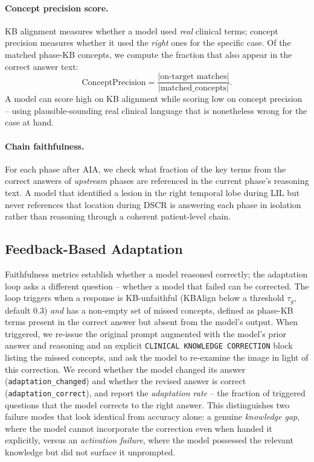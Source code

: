 \documentclass[11pt]{article}
\begin{document}
\paragraph{Concept precision score.} KB alignment measures whether a model used \emph{real} clinical terms; concept precision measures whether it used the \emph{right} ones for the specific case. Of the matched phase-KB concepts, we compute the fraction that also appear in the correct answer text:
\begin{equation}
  \label{eq:concept-precision}
  \text{ConceptPrecision} = \frac{|\text{on-target matches}|}{|\text{matched\_concepts}|}.
\end{equation}
A model can score high on KB alignment while scoring low on concept precision -- using plausible-sounding real clinical language that is nonetheless wrong for the case at hand.

\paragraph{Chain faithfulness.} For each phase after AIA, we check what fraction of the key terms from the correct answers of \emph{upstream} phases are referenced in the current phase's reasoning text. A model that identified a lesion in the right temporal lobe during LIL but never references that location during DSCR is answering each phase in isolation rather than reasoning through a coherent patient-level chain.

\subsection{Feedback-Based Adaptation}
\label{sec:adaptation}

Faithfulness metrics establish whether a model reasoned correctly; the adaptation loop asks a different question -- whether a model that failed can be corrected. The loop triggers when a response is KB-unfaithful (KBAlign below a threshold $\tau_g$, default $0.3$) \emph{and} has a non-empty set of missed concepts, defined as phase-KB terms present in the correct answer but absent from the model's output. When triggered, we re-issue the original prompt augmented with the model's prior answer and reasoning and an explicit \texttt{CLINICAL KNOWLEDGE CORRECTION} block listing the missed concepts, and ask the model to re-examine the image in light of this correction. We record whether the model changed its answer (\texttt{adaptation\_changed}) and whether the revised answer is correct (\texttt{adaptation\_correct}), and report the \emph{adaptation rate} -- the fraction of triggered questions that the model corrects to the right answer. This distinguishes two failure modes that look identical from accuracy alone: a genuine \emph{knowledge gap}, where the model cannot incorporate the correction even when handed it explicitly, versus an \emph{activation failure}, where the model possessed the relevant knowledge but did not surface it unprompted.
\end{document}
